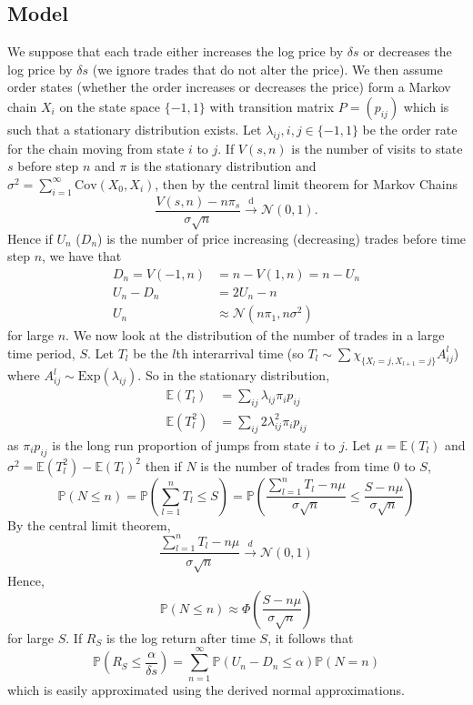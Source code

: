 \documentclass[a4paper,10pt]{article}
\begin{document}
\subsection{Model}
We suppose that each trade either increases the log price by $\delta s$ or decreases the log price by $\delta s$ (we ignore trades that do not alter the price). We then assume order states (whether the order increases or decreases the price) form a Markov chain $X_i$ on the state space $\{-1, 1\}$ with transition matrix $P = (p_{ij})$ which is such that a stationary distribution exists. Let $\lambda_{ij}, i,j \in \{-1, 1\}$ be the order rate for the chain moving from state $i$ to $j$. If $V(s, n)$ is the number of visits to state $s$ before step $n$ and $\pi$ is the stationary distribution and $\sigma^2 = \sum_{i=1}^{\infty}\text{Cov}(X_0, X_i)$, then by the central limit theorem for Markov Chains \cite{markovclt}
\begin{equation}
\frac{V(s, n) - n\pi_s}{\sigma \sqrt{n}} \xrightarrow{\text{d}} \mathcal{N}(0, 1).
\end{equation}
Hence if $U_n$ ($D_n$) is the number of price increasing (decreasing) trades before time step $n$, we have that
\begin{align}
D_n = V(-1, n) &= n - V(1, n) = n - U_n \\
U_n - D_n &= 2U_n - n \\
U_n &\approx  \mathcal{N}(n\pi_1, n\sigma^2)
\end{align}
for large $n$. 
We now look at the distribution of the number of trades in a large time period, $S$. Let $T_l$ be the $l$th interarrival time (so $T_l \sim \sum \chi_{\{X_l = j, X_{l + 1} = j\}} A_{ij}^l $) where $A_{ij}^l \sim \text{Exp}(\lambda_{ij})$. So in the stationary distribution,
\begin{align}
\mathbb{E}(T_l) &= \sum_{ij} \lambda_{ij}\pi_{i}p_{ij}\\
\mathbb{E}(T_l^2) &=  \sum_{ij} 2\lambda_{ij}^2\pi_{i}p_{ij}
\end{align}
as $\pi_i p_{ij}$ is the long run proportion of jumps from state $i$ to $j$. Let $\mu = \mathbb{E}(T_l)$ and $\sigma^2 = \mathbb{E}(T_l^2) - \mathbb{E}(T_l)^2$ then if $N$ is the number of trades from time $0$ to $S$,
\begin{equation}
\mathbb{P}(N \leq n) = \mathbb{P}\left(\sum_{l=1}^n T_l \leq S\right) = \mathbb{P}\left(\frac{\sum_{l=1}^n T_l - n\mu}{\sigma \sqrt{n}} \leq \frac{S - n\mu}{\sigma \sqrt{n}} \right) 
\end{equation}
By the central limit theorem, 
\begin{equation}
\frac{\sum_{l=1}^n T_l - n\mu}{\sigma \sqrt{n}} \xrightarrow{d} \mathcal{N}(0, 1)
\end{equation}
Hence,
\begin{equation}
\mathbb{P}(N \leq n) \approx \Phi\left(\frac{S - n\mu}{\sigma \sqrt{n}} \right)
\end{equation}
for large $S$. If $R_S$ is the log return after time $S$, it follows that
\begin{equation}
\mathbb{P}\left(R_S \leq \frac{\alpha}{\delta s}\right) = \sum_{n=1}^{\infty} \mathbb{P}\left(U_n - D_n \leq \alpha\right)\mathbb{P}(N = n)
\end{equation}
which is easily approximated using the derived normal approximations.
\end{document}
